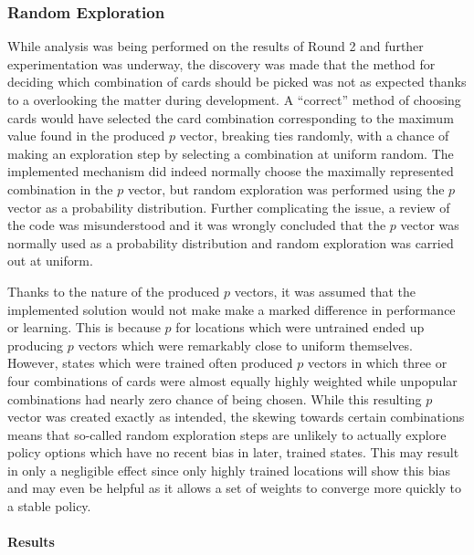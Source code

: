 
\subsubsection*{Random Exploration}
\label{sec:findings-expts-rand}

While analysis was being performed on the results of Round 2 and further
experimentation was underway,
the discovery was made that the method for deciding which combination of cards
should be picked was not as expected
thanks to a overlooking the matter during development.
%
A ``correct'' method of choosing cards would have selected the card combination
corresponding to the maximum value found in the produced $p$ vector,
breaking ties randomly,
with a chance of making an exploration step by selecting a combination at
uniform random.
%
The implemented mechanism did indeed normally choose the maximally represented
combination in the $p$ vector,
but random exploration was performed using the $p$ vector as a probability
distribution.
%
Further complicating the issue,
a review of the code was misunderstood and it was wrongly concluded that
the $p$ vector was normally used as a probability distribution
and random exploration was carried out at uniform.

Thanks to the nature of the produced $p$ vectors,
it was assumed that the implemented solution would not make make a marked
difference in performance or learning.
%
This is because $p$ for locations which were untrained 
ended up producing $p$ vectors which were remarkably close to
uniform themselves.
%
However,
states which were trained often produced $p$ vectors in which
three or four combinations of cards were almost equally highly weighted
while unpopular combinations had nearly zero chance of being chosen.
%
While this resulting $p$ vector was created exactly as intended,
the skewing towards certain combinations means that so-called
random exploration steps are unlikely to actually explore policy options
which have no recent bias
in later, trained states.
%
This may result in only a negligible effect since
only highly trained locations will show this bias
and may even be helpful as it allows a set of weights to converge more quickly
to a stable policy.


\paragraph*{Results}
\label{sec:findings-expts-rand-results}


